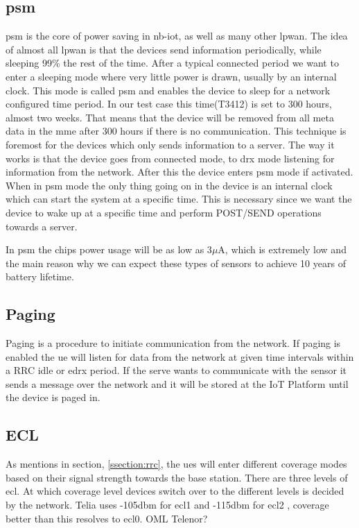 \documentclass[USenglish]{ifimaster}  %
\begin{document}
\subsection{\acrfull{psm}} \label{ssection:psm}
\acrshort{psm} is the core of power saving in \acrshort{nb-iot}, as well as many other \acrshort{lpwan}. The idea of almost all \acrshort{lpwan} is that the devices send information periodically, while sleeping 99\% the rest of the time. After a typical connected period we want to enter a sleeping mode where very little power is drawn, usually by an internal clock. This mode is called \acrshort{psm} and enables the device to sleep for a network configured time period. In our test case this time(\acrfull{T3412}) is set to 300 hours, almost two weeks. That means that the device will be removed from all meta data in the \acrshort{mme} after 300 hours if there is no communication. This technique is foremost for the devices which only sends information to a server. The way it works is that the device goes from connected mode, to \acrshort{drx} mode listening for information from the network. After this the device enters \acrshort{psm} mode if activated. When in \acrshort{psm} mode the only thing going on in the device is an internal clock which can start the system at a specific time. This is necessary since we want the device to wake up at a specific time and perform POST/SEND operations towards a server.

In \acrshort{psm} the chips power usage will be as low as 3$\mu$A, which is extremely low and the main reason why we can expect these types of sensors to achieve 10 years of battery lifetime.

\subsection{Paging} \label{ssection:paging}
Paging is a procedure to initiate communication from the network. If paging is enabled the \acrshort{ue} will listen for data from the network at given time intervals within a RRC idle or \acrshort{edrx} period. If the serve wants to communicate with the sensor it sends a message over the network and it will be stored at the IoT Platform until the device is paged in.

\subsection{ECL} \label{ssection:ecl}
As mentions in section, \vref{ssection:rrc}, the \acrshort{ue}s will enter different coverage modes based on their signal strength towards the base station. There are three levels of \acrfull{ecl}. At which coverage level devices switch over to the different levels is decided by the network. Telia uses -105\acrshort{dbm} for \acrshort{ecl}1 and -115\acrshort{dbm} for \acrshort{ecl}2 \cite{mail:teliaMailThread}, coverage better than this resolves to \acrshort{ecl}0. OML Telenor?
\end{document}
